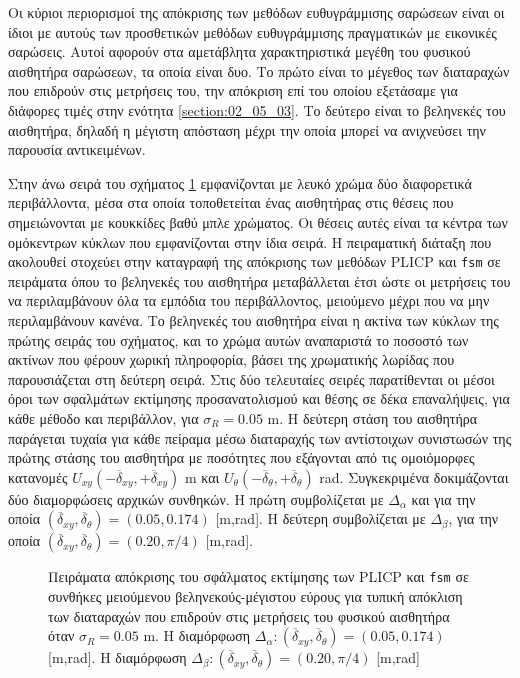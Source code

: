 Οι κύριοι περιορισμοί της απόκρισης των μεθόδων ευθυγράμμισης σαρώσεων είναι οι
ίδιοι με αυτούς των προσθετικών μεθόδων ευθυγράμμισης πραγματικών με εικονικές
σαρώσεις. Αυτοί αφορούν στα αμετάβλητα χαρακτηριστικά μεγέθη του φυσικού
αισθητήρα σαρώσεων, τα οποία είναι δυο. Το πρώτο είναι το μέγεθος των
διαταραχών που επιδρούν στις μετρήσεις του, την απόκριση επί του οποίου
εξετάσαμε για διάφορες τιμές στην ενότητα \ref{section:02_05_03}. Το δεύτερο
είναι το βεληνεκές του αισθητήρα, δηλαδή η μέγιστη απόσταση μέχρι την οποία
μπορεί να ανιχνεύσει την παρουσία αντικειμένων.

Στην άνω σειρά του σχήματος \ref{fig:02_05_04:03} εμφανίζονται με λευκό χρώμα
δύο διαφορετικά περιβάλλοντα, μέσα στα οποία τοποθετείται ένας αισθητήρας στις
θέσεις που σημειώνονται με κουκκίδες βαθύ μπλε χρώματος. Οι θέσεις αυτές είναι
τα κέντρα των ομόκεντρων κύκλων που εμφανίζονται στην ίδια σειρά. Η πειραματική
διάταξη που ακολουθεί στοχεύει στην καταγραφή της απόκρισης των μεθόδων
PLICP και \texttt{fsm} σε πειράματα όπου το βεληνεκές του αισθητήρα
μεταβάλλεται έτσι ώστε οι μετρήσεις του να περιλαμβάνουν όλα τα εμπόδια του
περιβάλλοντος, μειούμενο μέχρι που να μην περιλαμβάνουν κανένα. Το βεληνεκές
του αισθητήρα είναι η ακτίνα των κύκλων της πρώτης σειράς του σχήματος, και το
χρώμα αυτών αναπαριστά το ποσοστό των ακτίνων που φέρουν χωρική πληροφορία,
βάσει της χρωματικής λωρίδας που παρουσιάζεται στη δεύτερη σειρά. Στις δύο
τελευταίες σειρές παρατίθενται οι μέσοι όροι των σφαλμάτων εκτίμησης
προσανατολισμού και θέσης σε δέκα επαναλήψεις, για κάθε μέθοδο και περιβάλλον,
για $\sigma_R = 0.05$ m. Η δεύτερη στάση του αισθητήρα παράγεται τυχαία για
κάθε πείραμα μέσω διαταραχής των αντίστοιχων συνιστωσών της πρώτης στάσης του
αισθητήρα με ποσότητες που εξάγονται από τις ομοιόμορφες κατανομές
$U_{xy}(-\overline{\delta}_{xy},+\overline{\delta}_{xy})$ m και
$U_{\theta}(-\overline{\delta}_{\theta},+\overline{\delta}_{\theta})$ rad.
Συγκεκριμένα δοκιμάζονται δύο διαμορφώσεις αρχικών συνθηκών. H πρώτη
συμβολίζεται με $\Delta_\alpha$ και για την οποία
$(\overline{\delta}_{xy}, \overline{\delta}_{\theta}) = (0.05,0.174)$ [m,rad].
Η δεύτερη συμβολίζεται με $\Delta_\beta$, για την οποία
$(\overline{\delta}_{xy},\overline{\delta}_{\theta}) = (0.20,\pi/4)$ [m,rad].

\begin{figure}[]\centering
  
  \vspace{-2cm}
  \caption{\small Πειράματα απόκρισης του σφάλματος εκτίμησης των PLICP
           και \texttt{fsm} σε συνθήκες μειούμενου βεληνεκούς-μέγιστου εύρους
           για τυπική απόκλιση των διαταραχών που επιδρούν στις μετρήσεις του
           φυσικού αισθητήρα όταν $\sigma_R = 0.05$ m. Η διαμόρφωση
           $\Delta_\alpha: (\overline{\delta}_{xy}, \overline{\delta}_{\theta})
           = (0.05,0.174)$ [m,rad]. Η διαμόρφωση $\Delta_\beta:
           (\overline{\delta}_{xy},\overline{\delta}_{\theta}) = (0.20,\pi/4)$
           [m,rad]}
  \label{fig:02_05_04:03}
\end{figure}


